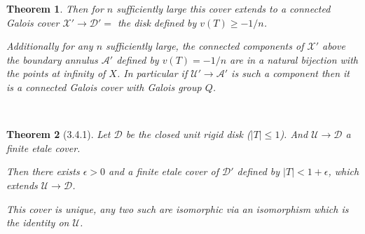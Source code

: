 \documentclass[oneside,12pt,]{article}
\newtheorem{theorem}{Theorem}
\DeclareMathOperator{\Spec}{Spec}
\newcommand{\lb}{[}
\newcommand{\rb}{]}
\DeclareMathOperator{\aff}{\mathbf{A}}
\DeclareMathOperator{\PP}{\mathbf{P}}
\newcommand{\gt}{>}
\begin{document}
\begin{theorem}
Then for $n$ sufficiently large this cover extends to a connected Galois cover $\mathscr X ' \to \mathscr D ' = $ the disk defined by $v(T) \ge -1/n$.

Additionally for any $n$ sufficiently large, the connected components of $\mathscr X'$ above the boundary annulus $\mathscr A'$ defined by $v(T) = -1/n$ are in a natural bijection with the points at infinity of $X$. In particular if $\mathscr U' \to \mathscr A'$ is such a component then it is a connected Galois cover with Galois group $Q$.
\end{theorem}
~\\
%
%

\begin{theorem}[3.4.1]
    Let $\mathscr D$ be the closed unit rigid disk ($|T| \le 1$).
    And $ \mathscr U \to \mathscr D$ a finite etale cover.

    Then there exists $\epsilon  \gt 0$ and a finite etale cover of $\mathscr D'$ defined by $|T| < 1 + \epsilon $, which extends $\mathscr U \to \mathscr D$.


    This cover is unique, any two such are isomorphic via an isomorphism which is the identity on $\mathscr U$.
\end{theorem}
\end{document}

